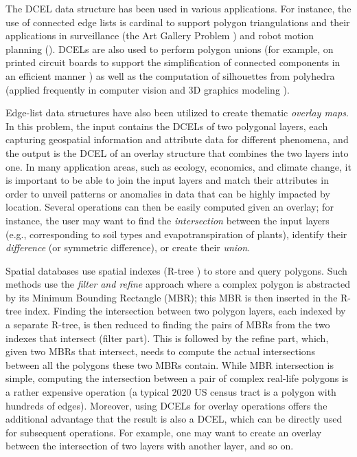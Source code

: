 The DCEL data structure has been used in various applications. For instance, the use of connected edge lists is cardinal to support polygon triangulations and their applications in surveillance (the Art Gallery Problem \cite{chvatal_combinatorial_1975, orourke_art_1987}) and robot motion planning (\cite{berg_computational_2008, chew_convex_1993}). DCELs are also used to perform polygon unions (for example, on printed circuit boards to support the simplification of connected components in an efficient manner \cite{fogel_cgal_2012}) as well as the computation of silhouettes from polyhedra \cite{fogel_cgal_2012, berberich_arrangements_2010} (applied frequently in computer vision and 3D graphics modeling \cite{boguslawski_modelling_2011}).

Edge-list data structures have also been utilized to create thematic \textit{overlay maps}. In this problem, the input contains the DCELs of two polygonal layers, each capturing geospatial information and attribute data for different phenomena, and the output is the DCEL of an overlay structure that combines the two layers into one. In many application areas, such as ecology, economics, and climate change, it is important to be able to join the input layers and match their attributes in order to unveil patterns or anomalies in data that can be highly impacted by location. Several operations can then be easily computed given an overlay; for instance, the user may want to find the \textit{intersection} between the input layers (e.g., corresponding to soil types and evapotranspiration of plants), identify their \textit{difference} (or symmetric difference), or create their \textit{union}. 

Spatial databases use spatial indexes (R-tree \cite{guttman_r-trees_1984, beckmann_r-tree_1990}) to store and query polygons. Such methods use the \textit{filter and refine} approach where a complex polygon is abstracted by its Minimum Bounding Rectangle (MBR); this MBR is then inserted in the R-tree index. Finding the intersection between two polygon layers, each indexed by a separate R-tree, is then reduced to finding the pairs of MBRs from the two indexes that intersect (filter part). This is followed by the refine part, which, given two MBRs that intersect, needs to compute the actual intersections between all the polygons these two MBRs contain. While MBR intersection is simple, computing the intersection between a pair of complex real-life polygons is a rather expensive operation (a typical 2020 US census tract is a polygon with hundreds of edges).  Moreover, using DCELs for overlay operations offers the additional advantage that the result is also a DCEL, which can be directly used for subsequent operations. For example, one may want to create an overlay between the intersection of two layers with another layer, and so on.

